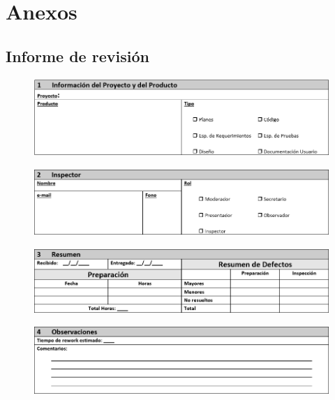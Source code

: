 \chapter{Anexos}
\section{Informe de revisión}

\begin{figure}[H]
\centering
\includegraphics[width=1\textwidth]{figures/anexos/1-1.PNG}
\end{figure}

\begin{figure}[H]
\centering
\includegraphics[width=1\textwidth]{figures/anexos/1-2.PNG}
\end{figure}

\begin{figure}[H]
\centering
\includegraphics[width=1\textwidth]{figures/anexos/1-3.PNG}
\end{figure}

\begin{figure}[H]
\centering
\includegraphics[width=1\textwidth]{figures/anexos/1-4.PNG}
\end{figure}

